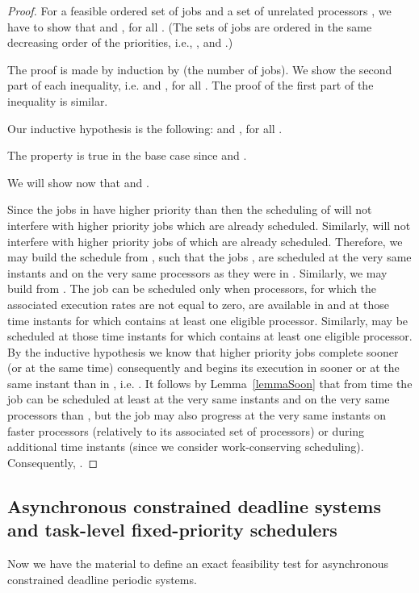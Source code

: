\documentclass[a4paper,11pt]{article}
\begin{document}
\begin{proof}
  For a feasible ordered set  of  jobs and a set of unrelated
  processors , we have to show that
   and
  , for all . (The sets of jobs are ordered in the same
  decreasing order of the priorities, i.e., ,  and .)

  The proof is made by induction by  (the number of jobs). We
  show the second part of each inequality, i.e.  and , for all . The proof of the first part of the inequality is
  similar.

  Our inductive hypothesis is the following:  and , for all .

  The property is true in the base case since  and .

  We will show now that  and
  .

  Since the jobs in  have higher priority than  then
  the scheduling of  will not interfere with higher priority
  jobs which are already scheduled. Similarly,  will not
  interfere with higher priority jobs of  which are
  already scheduled.  Therefore, we may build the schedule
   from , such that the jobs , are scheduled at the very same instants and on the
  very same processors as they were in . Similarly, we
  may build  from .  The job
   can be scheduled only when processors, for which the
  associated execution rates are not equal to zero, are available in
   and at those time instants  for
  which  contains at least one eligible
  processor. Similarly,  may be scheduled at those time
  instants  for which 
  contains at least one eligible processor. By the inductive
  hypothesis we know that higher priority jobs complete sooner (or at
  the same time) consequently  and  begins
  its execution in  sooner or at the same instant than
   in , i.e. . It follows by Lemma~\ref{lemmaSoon} that from
  time  the job  can be scheduled at least at the very
  same instants and on the very same processors than ,
  but the job  may also progress at the very same instants on
  faster processors (relatively to its associated set of processors)
  or during additional time instants (since we consider
  work-conserving scheduling). Consequently, .
\end{proof}

\subsection{Asynchronous constrained deadline systems and task-level fixed-priority schedulers}

Now we have the material to define an exact feasibility test for
asynchronous constrained deadline periodic systems.
\end{document}
